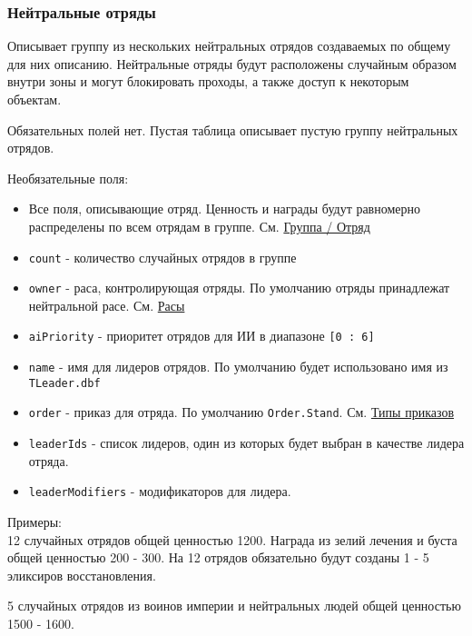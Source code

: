 \subsubsection{Нейтральные отряды}
\label{neutralStacks}
Описывает группу из нескольких нейтральных отрядов создаваемых по общему для них описанию.
Нейтральные отряды будут расположены случайным образом внутри зоны и могут блокировать проходы, а также доступ к некоторым объектам.

Обязательных полей нет. Пустая таблица описывает пустую группу нейтральных отрядов.

Необязательные поля:
\begin{itemize}
\item Все поля, описывающие отряд. Ценность и награды будут равномерно распределены по всем отрядам в группе. См. \hyperref[group]{Группа / Отряд}
\item \texttt{count} - количество случайных отрядов в группе
\item \texttt{owner} - раса, контролирующая отряды. По умолчанию отряды принадлежат нейтральной расе. См. \hyperref[raceTypes]{Расы}
\item \texttt{aiPriority} - приоритет отрядов для ИИ в диапазоне \texttt{[0 : 6]}
\item \texttt{name} - имя для лидеров отрядов. По умолчанию будет использовано имя из \texttt{TLeader.dbf}
\item \texttt{order} - приказ для отряда. По умолчанию \texttt{Order.Stand}. См. \hyperref[orderTypes]{Типы приказов}
\item \texttt{leaderIds} - список лидеров, один из которых будет выбран в качестве лидера отряда.
\item \texttt{leaderModifiers} - модификаторов для лидера.
\end{itemize}

Примеры:\\
12 случайных отрядов общей ценностью 1200.
Награда из зелий лечения и буста общей ценностью 200 - 300.
На 12 отрядов обязательно будут созданы  1 - 5 эликсиров восстановления.

\begin{figure}[H]

\end{figure}

5 случайных отрядов из воинов империи и нейтральных людей общей ценностью 1500 - 1600.

\begin{figure}[H]

\end{figure}